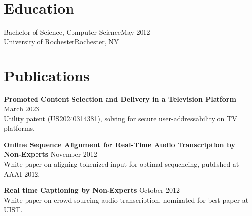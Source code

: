 \section{Education}

  Bachelor of Science, Computer Science\hfill May 2012\\
  University of Rochester\hfill Rochester, NY\\

\section{Publications}

\begin{flushleft}

  \textbf{Promoted Content Selection and Delivery in a Television Platform} \hfill March  2023\\
  Utility patent (US20240314381), solving for secure user-addressability on TV platforms.

  \vspace{10pt}    

  \textbf{Online Sequence Alignment for Real-Time Audio Transcription by Non-Experts} \hfill November 2012\\
  White-paper on aligning tokenized input for optimal sequencing, published at AAAI 2012.

  \vspace{10pt}    

  \textbf{Real time Captioning by Non-Experts} \hfill October  2012\\
  White-paper on crowd-sourcing audio transcription, nominated for best paper at UIST.
  
\end{flushleft}